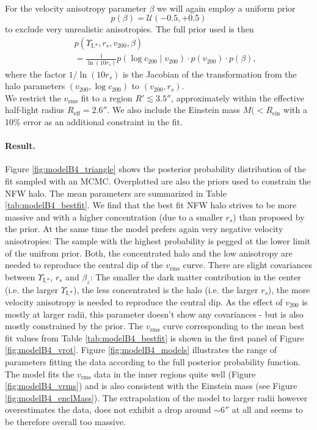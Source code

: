 \\For the velocity anisotropy parameter $\beta$ we will again employ a uniform prior 
\begin{equation*}
p(\beta) = \mathscr{U}(-0.5,+0.5)
\end{equation*}
to exclude very unrealistic anisotropies. The full prior used is then
\begin{eqnarray*}
&&p(\Upsilon_\text{I,*},r_s,v_{200},\beta) \\
&&= \frac{1}{\ln\left( 10 r_s\right)} p(\log c_{200} \mid v_{200}) \cdot p(v_{200}) \cdot p(\beta), 
\end{eqnarray*}
where the factor $1/\ln\left( 10 r_s\right)$ is the Jacobian of the transformation from the halo parameters $(v_{200},\log c_{200})$ to $(v_{200},r_s)$.
\\We restrict the $v_\text{rms}$ fit to a region $R' \lesssim 3.5''$, approximately within the effective half-light radius $R_\text{eff} = 2.6''$. We also include the Einstein mass $M(<R_\text{ein}$ with a 10\% error as an additional constraint in the fit. 


\paragraph{Result.} Figure \ref{fig:modelB4_triangle} shows the posterior probability distribution of the fit sampled with an MCMC. Overplotted are also the priors used to constrain the NFW halo. The mean parameters are summarized in Table \ref{tab:modelB4_bestfit}. We find that the best fit NFW halo strives to be more massive and with a higher concentration (due to a smaller $r_s$) than  proposed by the prior. At the same time the model prefers again very negative velocity anisotropies: The sample with the highest probability is pegged at the lower limit of the unifrom prior. Both, the concentrated halo and the low anisotropy are needed to reproduce the central dip of the $v_\text{rms}$ curve. There are slight covariances between $\Upsilon_\text{I,*}$,  $r_s$ and $\beta_z$: The smaller the dark matter contribution in the center (i.e. the larger $\Upsilon_\text{I,*}$), the less concentrated is the halo (i.e. the larger $r_s$), the more velocity anisotropy is needed to reproduce the central dip. As the effect of $v_{200}$ is mostly at larger radii, this parameter doesn't show any covariances - but is also mostly constrained by the prior. The $v_\text{rms}$ curve corresponding to the mean best fit values from Table \ref{tab:modelB4_bestfit} is shown in the first panel of Figure \ref{fig:modelB4_vrot}. Figure \ref{fig:modelB4_models} illustrates the range of parameters fitting the data according to the full posterior probability function. The model fits the $v_\text{rms}$ data in the inner regions quite well (Figure \ref{fig:modelB4_vrms}) and is also consistent with the Einstein mass (see Figure \ref{fig:modelB4_enclMass}). The extrapolation of the model to larger radii however overestimates the data, does not exhibit a drop around $\sim 6''$ at all and seems to be therefore overall too massive.\\

